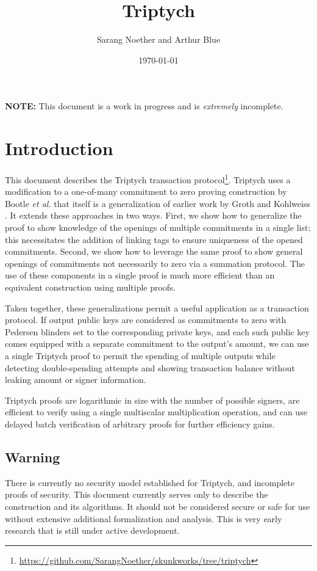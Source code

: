 \documentclass[draft]{article}
\title{Triptych}
\author{Sarang Noether and Arthur Blue}
\date{\today}
\begin{document}
\maketitle

\textbf{NOTE:} This document is a work in progress and is \textit{extremely} incomplete.


\section{Introduction}
This document describes the Triptych transaction protocol\footnote{\url{https://github.com/SarangNoether/skunkworks/tree/triptych}}.
Triptych uses a modification to a one-of-many commitment to zero proving construction by Bootle \textit{et al.} \cite{bootle} that itself is a generalization of earlier work by Groth and Kohlweiss \cite{groth}.
It extends these approaches in two ways.
First, we show how to generalize the proof to show knowledge of the openings of multiple commitments in a single list; this necessitates the addition of linking tags to ensure uniqueness of the opened commitments.
Second, we show how to leverage the same proof to show general openings of commitments not necessarily to zero via a summation protocol.
The use of these components in a single proof is much more efficient than an equivalent construction using multiple proofs.

Taken together, these generalizations permit a useful application as a transaction protocol.
If output public keys are considered as commitments to zero with Pedersen blinders set to the corresponding private keys, and each such public key comes equipped with a separate commitment to the output's amount, we can use a single Triptych proof to permit the spending of multiple outputs while detecting double-spending attempts and showing transaction balance without leaking amount or signer information.

Triptych proofs are logarithmic in size with the number of possible signers, are efficient to verify using a single multiscalar multiplication operation, and can use delayed batch verification of arbitrary proofs for further efficiency gains.

\subsection{Warning}
There is currently no security model established for Triptych, and incomplete proofs of security.
This document currently serves only to describe the construction and its algorithms.
It should not be considered secure or safe for use without extensive additional formalization and analysis.
This is very early research that is still under active development.
\end{document}
